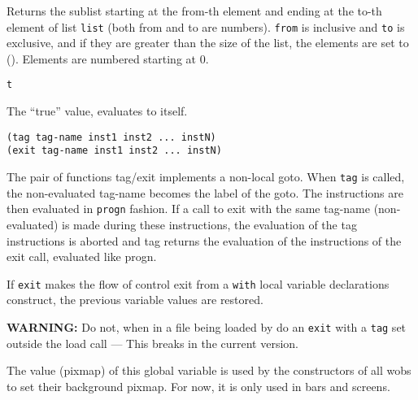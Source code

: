 Returns the sublist starting at the from-th element and ending at the to-th
element of list \verb"list" (both from and to are numbers). \verb"from" is
inclusive and \verb"to" is exclusive, and if they are greater than the size
of the list, the elements are set to (). Elements are numbered starting at
0.


        
{\usagefont\begin{verbatim}
t
\end{verbatim}}\usageupspace

The ``true'' value, evaluates to itself.

        
{\usagefont\begin{verbatim}
(tag tag-name inst1 inst2 ... instN)
(exit tag-name inst1 inst2 ... instN)
\end{verbatim}}\usageupspace

The pair of functions tag/exit implements a non-local goto.  When \verb"tag"
is called, the non-evaluated tag-name becomes the label of the goto. The
instructions are then evaluated in \verb"progn" fashion. If a call to exit
with the same tag-name (non-evaluated) is made during these instructions, the
evaluation of the tag instructions is aborted and tag returns the
evaluation of the instructions of the exit call, evaluated like progn.

If \verb"exit" makes the flow of control exit from a
\verb"with" local variable declarations construct, the previous variable
values are restored.

{\bf WARNING:} Do not, when in a file being loaded by  do an
\verb"exit" with a \verb"tag" set outside the load call --- This breaks
{\GWM} in the current version.

        

The value (pixmap) of this global variable is used by the constructors of all
wobs to set their background pixmap. For now, it is only used in bars and
screens.

